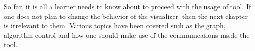 So far, it is all a learner needs to know about to proceed with the usage of tool. If one does not plan to change the behavior of the visualizer, then the next chapter is irrelevant to them. Various topics have been covered such as the graph, algorithm control and how one should make use of the communications inside the tool.
